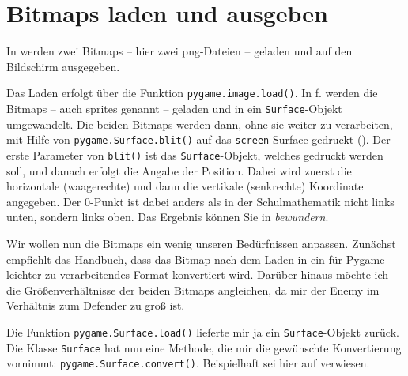 \section{Bitmaps laden und ausgeben}


In  werden zwei Bitmaps -- hier zwei png-Dateien -- geladen und auf den Bildschirm ausgegeben. 

Das Laden erfolgt über die Funktion \texttt{pygame.image.load()}. In f. werden die Bitmaps -- auch \glspl{sprite} genannt -- geladen und in ein \texttt{Surface}-Objekt umgewandelt. Die beiden Bitmaps werden dann, ohne sie weiter zu verarbeiten, mit Hilfe von \texttt{pygame.Sur\-face.\-blit()} auf das \texttt{screen}-Surface gedruckt (). Der erste Parameter von \texttt{blit()} ist das \texttt{Surface}-Objekt, welches gedruckt werden soll, und danach erfolgt die Angabe der Position. Dabei wird zuerst die horizontale (waagerechte) und dann die vertikale (senkrechte) Koordinate angegeben. Der 0-Punkt ist dabei anders als in der Schulmathematik nicht links unten, sondern links oben. Das Ergebnis können Sie in  \emph{bewundern}.


Wir wollen nun die Bitmaps ein wenig unseren Bedürfnissen anpassen. Zunächst empfiehlt das Handbuch, dass das Bitmap nach dem Laden in ein für Pygame leichter zu verarbeitendes Format konvertiert wird. Darüber hinaus möchte ich die Größenverhältnisse der beiden Bitmaps angleichen, da mir der Enemy im Verhältnis zum Defender zu groß ist. 


Die Funktion \texttt{pygame.Surface.load()} lieferte mir ja ein \texttt{Surface}-Objekt zurück. Die Klasse \texttt{Surface} hat nun eine Methode, die mir die gewünschte Konvertierung vornimmt: \texttt{pygame.Surface.convert()}. Beispielhaft sei hier auf  verwiesen. 

